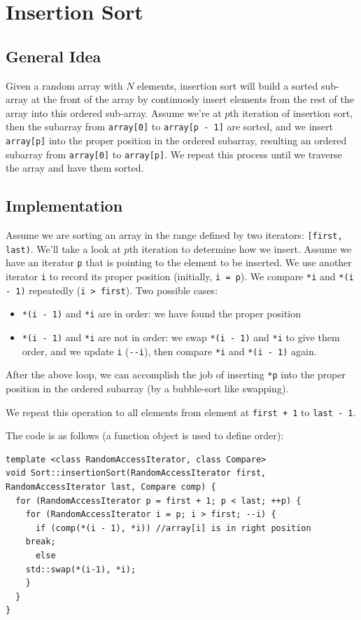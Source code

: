 \documentclass[12pt]{book}
\begin{document}
\chapter{Insertion Sort}
\label{sec:orgad8b67d}
\section{General Idea}
\label{sec:orgdd1fff0}
Given a random array with \(N\) elements, insertion sort will build a sorted sub-array at the front of the array by continuosly insert elements from the rest of the array into this ordered sub-array. Assume we're at \(p\)th iteration of insertion sort, then the subarray from \texttt{array[0]} to \texttt{array[p - 1]} are sorted, and we insert \texttt{array[p]} into the proper position in the ordered subarray, resulting an ordered subarray from \texttt{array[0]} to \texttt{array[p]}. We repeat this process until we traverse the array and have them sorted.
\section{Implementation}
\label{sec:org3601dc4}
Assume we are sorting an array in the range defined by two iterators: \texttt{[first, last)}. We'll take a look at \(p\)th iteration to determine how we insert. Assume we have an iterator \texttt{p} that is pointing to the element to be inserted. We use another iterator \texttt{i} to record its proper position (initially, \texttt{i = p}). We compare \texttt{*i} and \texttt{*(i - 1)} repeatedly (\texttt{i > first}). Two possible cases:
\begin{itemize}
\item \texttt{*(i - 1)} and \texttt{*i} are in order: we have found the proper position
\item \texttt{*(i - 1)} and \texttt{*i} are not in order: we swap \texttt{*(i - 1)} and \texttt{*i} to give them order, and we update \texttt{i} (\texttt{-{}-i}), then compare \texttt{*i} and \texttt{*(i - 1)} again.
\end{itemize}

After the above loop, we can accomplish the job of inserting \texttt{*p} into the proper position in the ordered subarray (by a bubble-sort like swapping).

We repeat this operation to all elements from element at \texttt{first + 1} to \texttt{last - 1}.

The code is as follows (a function object is used to define order):
\begin{verbatim}
template <class RandomAccessIterator, class Compare>
void Sort::insertionSort(RandomAccessIterator first, RandomAccessIterator last, Compare comp) {
  for (RandomAccessIterator p = first + 1; p < last; ++p) {
    for (RandomAccessIterator i = p; i > first; --i) {
      if (comp(*(i - 1), *i)) //array[i] is in right position
	break;
      else 
	std::swap(*(i-1), *i);
    }
  }  
}
\end{verbatim}
\end{document}
